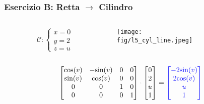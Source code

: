 \documentclass{beamer}
\newcommand{\fig}{./figures} %
\newcommand{\msin}{\mbox{sin}} %
\newcommand{\mcos}{\mbox{cos}} %
\begin{document}
\begin{frame}
\frametitle{Esercizio B: Retta $\rightarrow$ Cilindro}
\begin{columns}
\begin{column}{0.58\textwidth}
\begin{displaymath}
\mathcal{C}:
\begin{cases}
x = 0\\
y = 2\\
z = u
\end{cases}
\end{displaymath}
\end{column}
\begin{column}{0.39\textwidth}
\texttt{[image: \\fig/l5\_cyl\_line.jpeg]}

\end{column}
\end{columns}
%
\vspace{0.1\textheight}
\begin{displaymath}
\begin{bmatrix}
\mcos(v) & -\msin(v) & 0 & 0\\
\msin(v) &  \mcos(v) & 0 & 0\\
0        & 0         & 1 & 0\\
0        & 0         & 0 & 1
\end{bmatrix}
\cdot
\begin{bmatrix}
0\\
2\\
u\\
1
\end{bmatrix}
= 
{\color{blue}
\begin{bmatrix}
-2\msin(v)\\
2\mcos(v)\\
u\\
1
\end{bmatrix}
}
\end{displaymath}
\end{frame}
\end{document}
